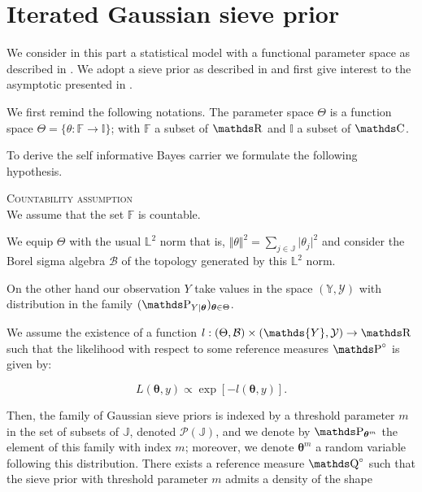 \section{Iterated Gaussian sieve prior}\label{2.1}

We consider in this part a statistical model with a functional parameter space as described in .
We adopt a sieve prior as described in  and first give interest to the asymptotic presented in .

\medskip

We first remind the following notations.
The parameter space $\Theta$ is a function space $\Theta = \{ \theta : \mathds{F} \rightarrow \mathds{I} \}$; with $\mathds{F}$ a subset of $\R$ and $\mathds{I}$ a subset of $\C$.

To derive the self informative Bayes carrier we formulate the following hypothesis.

\begin{as}{\textsc{Countability assumption}\\}\label{as2.1.1}
We assume that the set $\mathds{F}$ is countable.
\end{as}

We equip $\Theta$ with the usual $\mathds{L}^{2}$ norm that is, $\Vert \theta \Vert^{2} = \sum\limits_{j \in \mathds{J}} \vert \theta_{j} \vert^{2}$ and consider the Borel sigma algebra $\mathcal{B}$ of the topology generated by this $\mathds{L}^{2}$ norm.

On the other hand our observation $Y$ take values in the space $(\mathds{Y}, \mathcal{Y})$ with distribution in the family $(\P_{Y \vert \boldsymbol{\theta}})_{\boldsymbol{\theta} \in \Theta}$.


We assume the existence of a function $l: (\Theta, \mathcal{B}) \times (\mathds{Y}, \mathcal{Y}) \rightarrow \R$ such that the likelihood with respect to some reference measures $\P^{\circ}$ is given by:

\[L(\boldsymbol{\theta}, y) \propto \exp\left[-l(\boldsymbol{\theta}, y)\right].\]

Then, the family of Gaussian sieve priors is indexed by a threshold parameter $m$ in the set of subsets of $\mathds{J}$, denoted $\mathcal{P}(\mathds{J})$, and we denote by $\P_{\boldsymbol{\theta}^{m}}$ the element of this family with index $m$; moreover, we denote $\boldsymbol{\theta}^{m}$ a random variable following this distribution. 
There exists a reference measure $\Q^{\circ}$ such that the sieve prior with threshold parameter $m$ admits a density of the shape

